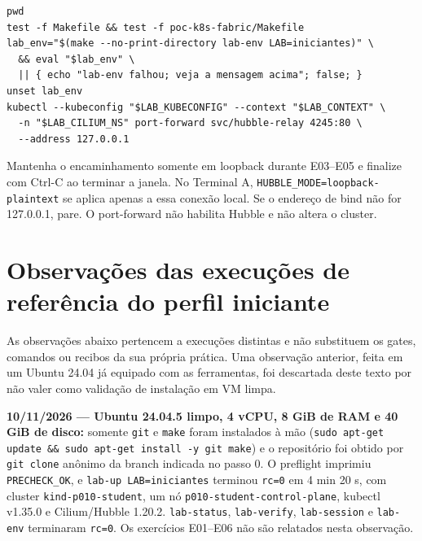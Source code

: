 \documentclass[12pt,openany,oneside,a4paper,chapter=TITLE,english,brazil]{abntex2}
\begin{document}
\begin{apendicesenv}
\begin{verbatim}
pwd
test -f Makefile && test -f poc-k8s-fabric/Makefile
lab_env="$(make --no-print-directory lab-env LAB=iniciantes)" \
  && eval "$lab_env" \
  || { echo "lab-env falhou; veja a mensagem acima"; false; }
unset lab_env
kubectl --kubeconfig "$LAB_KUBECONFIG" --context "$LAB_CONTEXT" \
  -n "$LAB_CILIUM_NS" port-forward svc/hubble-relay 4245:80 \
  --address 127.0.0.1
\end{verbatim}

Mantenha o encaminhamento somente em loopback durante E03--E05 e finalize com
Ctrl-C ao terminar a janela. No Terminal A, \texttt{HUBBLE\_\allowbreak{}MODE=\allowbreak{}loopback-{}\allowbreak{}plaintext}
se aplica apenas a essa conexão local. Se o endereço de bind não for
127.0.0.1, pare. O port-forward não habilita Hubble e não altera o cluster.

\section*{Observações das execuções de referência do perfil iniciante}\label{observauxe7uxf5es-das-execuuxe7uxf5es-de-referuxeancia-do-perfil-iniciante}

As observações abaixo pertencem a execuções distintas e não substituem os
gates, comandos ou recibos da sua própria prática. Uma observação anterior,
feita em um Ubuntu 24.04 já equipado com as ferramentas, foi descartada deste
texto por não valer como validação de instalação em VM limpa.

\textbf{10/11/2026 --- Ubuntu 24.04.5 limpo, 4 vCPU, 8 GiB de RAM e 40 GiB de disco:}
somente \texttt{git} e \texttt{make} foram instalados à mão (\texttt{sudo apt-{}\allowbreak{}get update \&\& sudo apt-{}\allowbreak{}get install -{}\allowbreak{}y git make}) e o repositório foi obtido por \texttt{git clone} anônimo
da branch indicada no passo 0. O preflight imprimiu \texttt{PRECHECK\_\allowbreak{}OK}, e
\texttt{lab-{}\allowbreak{}up LAB=\allowbreak{}iniciantes} terminou \texttt{rc=\allowbreak{}0} em 4 min 20 s, com cluster
\texttt{kind-{}\allowbreak{}p010-{}\allowbreak{}student}, um nó \texttt{p010-{}\allowbreak{}student-{}\allowbreak{}control-{}\allowbreak{}plane}, kubectl v1.35.0 e
Cilium/Hubble 1.20.2. \texttt{lab-{}\allowbreak{}status}, \texttt{lab-{}\allowbreak{}verify}, \texttt{lab-{}\allowbreak{}session} e \texttt{lab-{}\allowbreak{}env}
terminaram \texttt{rc=\allowbreak{}0}. Os exercícios E01--E06 não são relatados nesta observação.


\end{apendicesenv}
\end{document}
